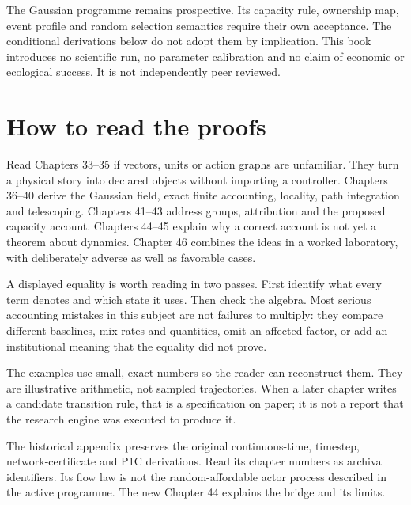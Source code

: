 The Gaussian programme remains prospective. Its capacity rule, ownership map,
event profile and random selection semantics require their own acceptance.
The conditional derivations below do not adopt them by implication. This
book introduces no scientific run, no parameter calibration and no claim of
economic or ecological success. It is not independently peer reviewed.

\chapter*{How to read the proofs}
Read Chapters 33--35 if vectors, units or action graphs are unfamiliar. They
turn a physical story into declared objects without importing a controller.
Chapters 36--40 derive the Gaussian field, exact finite accounting, locality,
path integration and telescoping. Chapters 41--43 address groups, attribution
and the proposed capacity account. Chapters 44--45 explain why a correct
account is not yet a theorem about dynamics. Chapter 46 combines the ideas
in a worked laboratory, with deliberately adverse as well as favorable cases.

A displayed equality is worth reading in two passes. First identify what
every term denotes and which state it uses. Then check the algebra. Most
serious accounting mistakes in this subject are not failures to multiply:
they compare different baselines, mix rates and quantities, omit an affected
factor, or add an institutional meaning that the equality did not prove.

The examples use small, exact numbers so the reader can reconstruct them.
They are illustrative arithmetic, not sampled trajectories. When a later
chapter writes a candidate transition rule, that is a specification on paper;
it is not a report that the research engine was executed to produce it.

The historical appendix preserves the original continuous-time, timestep,
network-certificate and P1C derivations. Read its chapter numbers as archival
identifiers. Its flow law is not the random-affordable actor process described
in the active programme. The new Chapter 44 explains the bridge and its limits.
